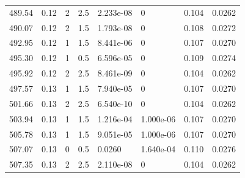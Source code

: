 \documentclass[preview]{standalone}
\begin{document}
{{{\begin{tabular}{L{1.2cm}C{1.2cm} C{0.3cm}C{0.5cm} C{1.4cm}C{1.4cm} C{1.4cm}C{1.4cm}}
  489.54  &  0.12  & 2     & 2.5 &  2.233e-08  & 0  & 0.104 &  0.0262   \\ 
  490.07  &  0.12  & 2     & 1.5 &  1.793e-08  & 0  & 0.108 &  0.0272   \\ 
  492.95  &  0.12  & 1     & 1.5 &  8.441e-06  & 0  & 0.107 &  0.0270   \\ 
  495.30  &  0.12  & 1     & 0.5 &  6.596e-05  & 0  & 0.109 &  0.0274   \\ 
  495.92  &  0.12  & 2     & 2.5 &  8.461e-09  & 0  & 0.104 &  0.0262   \\ 
  497.57  &  0.13  & 1     & 1.5 &  7.940e-05  & 0  & 0.107 &  0.0270   \\ 
  501.66  &  0.13  & 2     & 2.5 &  6.540e-10  & 0  & 0.104 &  0.0262   \\ 
  503.94  &  0.13  & 1     & 1.5 &  1.216e-04  & 1.000e-06  & 0.107 &  0.0270   \\ 
  505.78  &  0.13  & 1     & 1.5 &  9.051e-05  & 1.000e-06  & 0.107 &  0.0270   \\ 
  507.07  &  0.13  & 0     & 0.5 &  0.0260  & 1.640e-04  & 0.110 &  0.0276   \\ 
  507.35  &  0.13  & 2     & 2.5 &  2.110e-08  & 0  & 0.104 &  0.0262   \\ 
\hline 
\end{tabular} 

}}}
\end{document}

